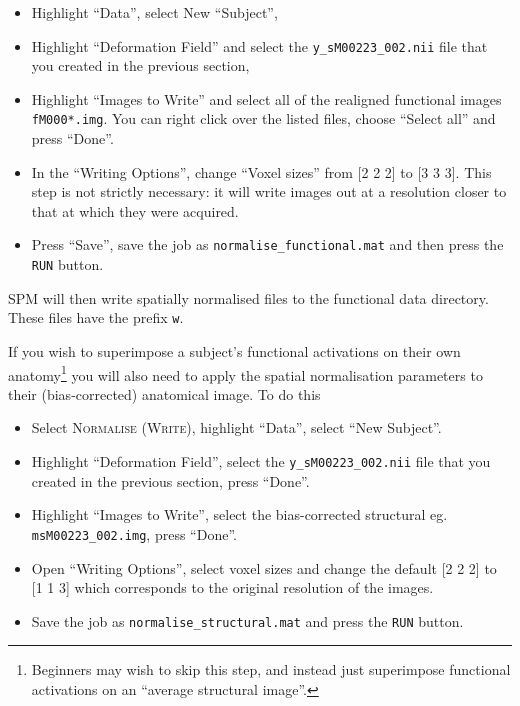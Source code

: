 \begin{itemize}
\item Highlight ``Data'', select New ``Subject'',
\item Highlight ``Deformation Field'' and select the \texttt{y\_sM00223\_002.nii} file that you created in the previous section,
\item Highlight ``Images to Write'' and select all of the realigned functional images \texttt{fM000*.img}. You can right click over the listed files, choose ``Select all'' and press ``Done''.
\item In the ``Writing Options'', change ``Voxel sizes'' from [2 2 2] to [3 3 3]. This step is not strictly necessary: it will write images out at a resolution closer to that at which they were acquired.
\item Press ``Save'', save the job as \texttt{normalise\_functional.mat} and then press the \texttt{RUN} button.
\end{itemize}

SPM will then write spatially normalised files to the functional data directory. These files have the prefix \texttt{w}.

If you wish to superimpose a subject's functional activations on their own anatomy\footnote{Beginners may wish to skip this step, and instead just superimpose functional activations on an ``average structural image''.} you will also need to apply the spatial normalisation parameters to their (bias-corrected) anatomical image. To do this

\begin{itemize}
\item Select \textsc{Normalise (Write)}, highlight ``Data'', select ``New Subject''.
\item Highlight ``Deformation Field'', select the  \texttt{y\_sM00223\_002.nii} file that you created in the previous section, press ``Done''.
\item Highlight ``Images to Write'', select the bias-corrected structural eg. \texttt{msM00223\_002.img}, press ``Done''.
\item Open ``Writing Options'', select voxel sizes and change the default [2 2 2] to [1 1 3] which corresponds to the original resolution of the images.
\item Save the job as \texttt{normalise\_structural.mat} and press the \texttt{RUN} button.
\end{itemize}

